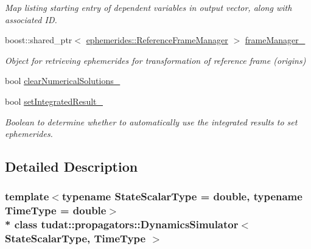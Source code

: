 \begin{DoxyCompactItemize}
\begin{DoxyCompactList}\small\item\em Map listing starting entry of dependent variables in output vector, along with associated ID. \end{DoxyCompactList}\item 
boost\+::shared\+\_\+ptr$<$ \hyperlink{classtudat_1_1ephemerides_1_1ReferenceFrameManager}{ephemerides\+::\+Reference\+Frame\+Manager} $>$ \hyperlink{classtudat_1_1propagators_1_1DynamicsSimulator_ad8c2c2ca0fc3ef961cdd545384828591}{frame\+Manager\+\_\+}\hypertarget{classtudat_1_1propagators_1_1DynamicsSimulator_ad8c2c2ca0fc3ef961cdd545384828591}{}\label{classtudat_1_1propagators_1_1DynamicsSimulator_ad8c2c2ca0fc3ef961cdd545384828591}

\begin{DoxyCompactList}\small\item\em Object for retrieving ephemerides for transformation of reference frame (origins) \end{DoxyCompactList}\item 
bool \hyperlink{classtudat_1_1propagators_1_1DynamicsSimulator_ad847a666b8dd2357df29a84f149665af}{clear\+Numerical\+Solutions\+\_\+}
\item 
bool \hyperlink{classtudat_1_1propagators_1_1DynamicsSimulator_a137d3c91596b6928910af05b27774df5}{set\+Integrated\+Result\+\_\+}\hypertarget{classtudat_1_1propagators_1_1DynamicsSimulator_a137d3c91596b6928910af05b27774df5}{}\label{classtudat_1_1propagators_1_1DynamicsSimulator_a137d3c91596b6928910af05b27774df5}

\begin{DoxyCompactList}\small\item\em Boolean to determine whether to automatically use the integrated results to set ephemerides. \end{DoxyCompactList}\end{DoxyCompactItemize}


\subsection{Detailed Description}
\subsubsection*{template$<$typename State\+Scalar\+Type = double, typename Time\+Type = double$>$\\*
class tudat\+::propagators\+::\+Dynamics\+Simulator$<$ State\+Scalar\+Type, Time\+Type $>$}

